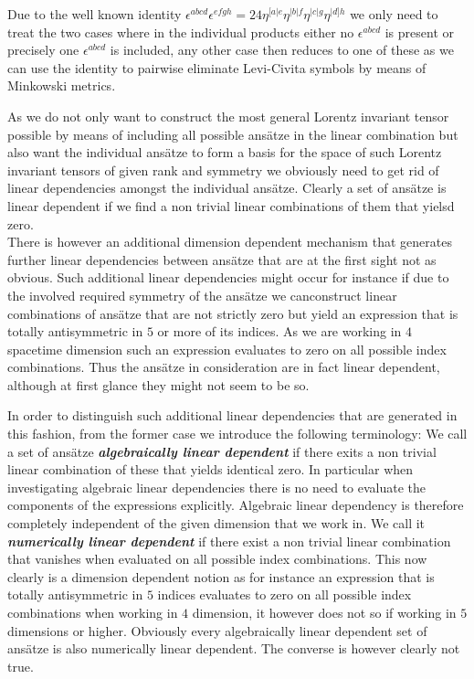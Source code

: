 \documentclass[a4paper,12pt, DIV=14, BCOR=5mm, twoside, headsepline, numbers=noenddot]{scrbook}
\begin{document}
Due to the well known identity $\epsilon^{abcd}\epsilon^{efgh} = 24 \eta^{[a\vert e}\eta^{\vert b \vert f}\eta^{\vert c \vert g}\eta^{\vert d] h}$ we only need to treat the two cases where in the individual products either no $\epsilon^{abcd}$ is present or precisely one $\epsilon^{abcd}$ is included, any other case then reduces to one of these as we can use the identity to pairwise eliminate Levi-Civita symbols by means of Minkowski metrics. 

As we do not only want to construct the most general Lorentz invariant tensor possible by means of including all possible ansätze in the linear combination but also want the individual ansätze to form a basis for the space of such Lorentz invariant tensors of given rank and symmetry we obviously need to get rid of linear dependencies amongst the individual ansätze. Clearly a set of ansätze is linear dependent if we find a non trivial linear combinations of them that yielsd zero. \\

There is however an additional dimension dependent mechanism that generates further linear dependencies between ansätze that are at the first sight not as obvious. Such additional linear dependencies might occur for instance if due to the involved required symmetry of the ansätze we canconstruct linear combinations of ansätze that are not strictly zero but yield an expression that is totally antisymmetric in $5$ or more of its indices. As we are working in $4$ spacetime dimension such an expression evaluates to zero on all possible index combinations. Thus the ansätze in consideration are in fact linear dependent, although at first glance they might not seem to be so. 

In order to distinguish such additional linear dependencies that are generated in this fashion, from the former case we introduce the following terminology: We call a set of ansätze \textit{\textbf{algebraically linear dependent}} if there exits a non trivial linear combination of these that yields identical zero. In particular when investigating algebraic linear dependencies there is no need to evaluate the components of the expressions explicitly. Algebraic linear dependency is therefore completely independent of the given dimension that we work in. We call it \textbf{\textit{numerically linear dependent}} if there exist a non trivial linear combination that vanishes when evaluated on all possible index combinations. This now clearly is a dimension dependent notion as for instance an expression that is totally antisymmetric in $5$ indices evaluates to zero on all possible index combinations when working in $4$ dimension, it however does not so if working in $5$ dimensions or higher. Obviously every algebraically linear dependent set of ansätze is also numerically linear dependent. The converse is however clearly not true. \\
\end{document}
